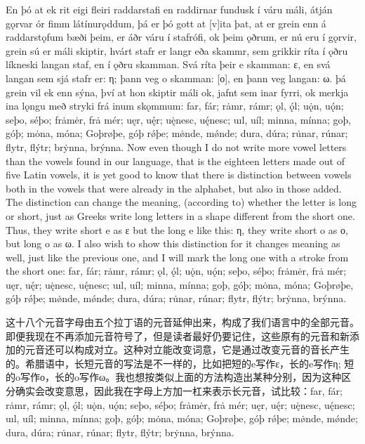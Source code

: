 \begin{paracol}{2}
    En þó at ek rit eigi fleiri raddarstafi en raddirnar fundusk í váru máli, átján gǫrvar ór fimm látínurǫddum, þá er þó gott at [v]ita þat, at er grein enn á raddarstǫfum bæði þeim, er áðr váru í stafrófi, ok þeim ǫðrum, er nú eru í gǫrvir, grein sú er máli skiptir, hvárt stafr er langr eða skammr, sem grikkir ríta í ǫðru líkneski langan staf, en í ǫðru skamman. Svá ríta þeir e skamman: ε, en svá langan sem sjá stafr er: η; þann veg o skamman: [ο], en þann veg langan: ω. þá grein vil ek enn sýna, því at hon skiptir máli ok, jafnt sem inar fyrri, ok merkja ina lǫngu með stryki frá inum skǫmmum: far, fár; rȧmr, rámr; ǫl, ǫ́l; uǫ̇n, uǫ́n; seþo, séþo; frȧmėr, frȧ mér; uęr, uę́r; uę̇nesc, uę́nesc; uıl, uíl; minna, mínna; goþ, góþ; mȯna, móna; Goþrøþe, góþ rǿþe; mø̇nde, mǿnde; dura, dúra; ru̇nar, rúnar; flytr, flýtr; brẏnna, brýnna.
    \switchcolumn
    Now even though I do not write more vowel letters than the vowels found in our language, that is the eighteen letters made out of five Latin vowels, it is yet good to know that there is distinction between vowels both in the vowels that were already in the alphabet, but also in those added. The distinction can change the meaning, (according to) whether the letter is long or short, just as Greeks write long letters in a shape different from the short one. Thus, they write short e as ε but the long e like this: η, they write short o as ο, but long o as ω. I also wish to show this distinction for it changes meaning as well, just like the previous one, and I will mark the long one with a stroke from the short one: far, fár; rȧmr, rámr; ǫl, ǫ́l; uǫ̇n, uǫ́n; seþo, séþo; frȧmėr, frȧ mér; uęr, uę́r; uę̇nesc, uę́nesc; uıl, uíl; minna, mínna; goþ, góþ; mȯna, móna; Goþrøþe, góþ rǿþe; mø̇nde, mǿnde; dura, dúra; ru̇nar, rúnar; flytr, flýtr; brẏnna, brýnna.
\end{paracol}
\begin{translation*}{}
    这十八个元音字母由五个拉丁语的元音延伸出来，构成了我们语言中的全部元音。即便我现在不再添加元音符号了，但是读者最好仍要记住，这些原有的元音和新添加的元音还可以构成对立。这种对立能改变词意，它是通过改变元音的音长产生的。希腊语中，长短元音的写法是不一样的，比如把短的e写作ε，长的e写作η; 短的o写作ο，长的o写作ω。我也想按类似上面的方法构造出某种分别，因为这种区分确实会改变意思，因此我在字母上方加一杠来表示长元音，试比较：far, fár; rȧmr, rámr; ǫl, ǫ́l; uǫ̇n, uǫ́n; seþo, séþo; frȧmėr, frȧ mér; uęr, uę́r; uę̇nesc, uę́nesc; uıl, uíl; minna, mínna; goþ, góþ; mȯna, móna; Goþrøþe, góþ rǿþe; mø̇nde, mǿnde; dura, dúra; ru̇nar, rúnar; flytr, flýtr; brẏnna, brýnna.
\end{translation*}

